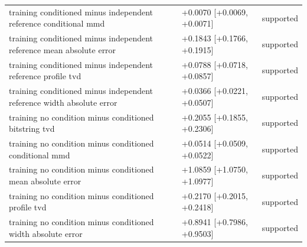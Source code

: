 \begin{table}[p]
\begin{tabular}{@{}p{}p{}p{}@{}}
training conditioned minus independent reference conditional mmd & +0.0070 [+0.0069, +0.0071] & supported \\
training conditioned minus independent reference mean absolute error & +0.1843 [+0.1766, +0.1915] & supported \\
training conditioned minus independent reference profile tvd & +0.0788 [+0.0718, +0.0857] & supported \\
training conditioned minus independent reference width absolute error & +0.0366 [+0.0221, +0.0507] & supported \\
training no condition minus conditioned bitstring tvd & +0.2055 [+0.1855, +0.2306] & supported \\
training no condition minus conditioned conditional mmd & +0.0514 [+0.0509, +0.0522] & supported \\
training no condition minus conditioned mean absolute error & +1.0859 [+1.0750, +1.0977] & supported \\
training no condition minus conditioned profile tvd & +0.2170 [+0.2015, +0.2418] & supported \\
training no condition minus conditioned width absolute error & +0.8941 [+0.7986, +0.9503] & supported \\
\bottomrule
\end{tabular}
\end{table}
\clearpage

